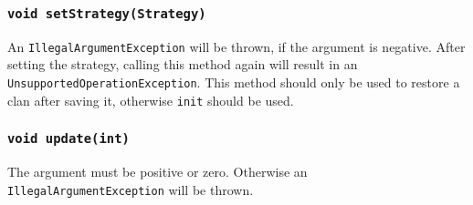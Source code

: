 \documentclass{article}
\begin{document}
\subsubsection{\texttt{void setStrategy(Strategy)}}
An \texttt{IllegalArgumentException} will be thrown, if the argument is negative.
After setting the strategy, calling this method again will result in an \texttt{UnsupportedOperationException}.
This method should only be used to restore a clan after saving it, otherwise \texttt{init} should be used.

\subsubsection{\texttt{void update(int)}}
The argument must be positive or zero. Otherwise an \texttt{IllegalArgumentException} will be thrown.
\end{document}
